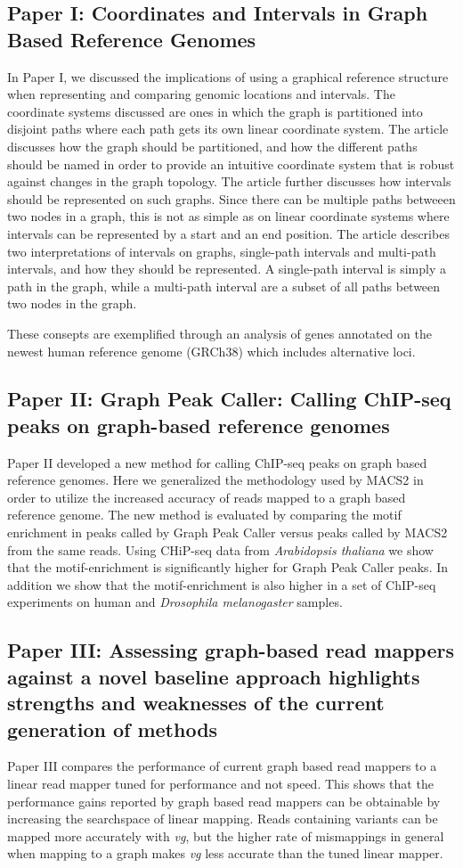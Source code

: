 \subsection*{Paper I: Coordinates and Intervals in Graph Based Reference Genomes}
In Paper I, we discussed the implications of using a graphical reference structure when representing and comparing genomic locations and intervals.
The coordinate systems discussed are ones in which the graph is partitioned into disjoint paths where each path gets its own linear coordinate system.
The article discusses how the graph should be partitioned, and how the different paths should be named in order to provide an intuitive coordinate system that is robust against changes in the graph topology. 
The article further discusses how intervals should be represented on such graphs.
Since there can be multiple paths betweeen two nodes in a graph, this is not as simple as on linear coordinate systems where intervals can be represented by a start and an end position.
The article describes two interpretations of intervals on graphs, single-path intervals and multi-path intervals, and how they should be represented.
A single-path interval is simply a path in the graph, while a multi-path interval are a subset of all paths between two nodes in the graph. 

These consepts are exemplified through an analysis of genes annotated on the newest human reference genome (GRCh38) which includes alternative loci.


\subsection*{Paper II: Graph Peak Caller: Calling ChIP-seq peaks on graph-based reference genomes}
Paper II developed a new method for calling ChIP-seq peaks on graph based reference genomes.
Here we generalized the methodology used by MACS2 in order to utilize the increased accuracy of reads mapped to a graph based reference genome.
The new method is evaluated by comparing the motif enrichment in peaks called by Graph Peak Caller versus peaks called by MACS2 from the same reads.
Using CHiP-seq data from \emph{Arabidopsis thaliana} we show that the motif-enrichment is significantly higher for Graph Peak Caller peaks.
In addition we show that the motif-enrichment is also higher in a set of ChIP-seq experiments on human and \emph{Drosophila melanogaster} samples.

\subsection*{Paper III: Assessing graph-based read mappers against a novel baseline approach highlights strengths and weaknesses of the current generation of methods}
Paper III compares the performance of current graph based read mappers to a linear read mapper tuned for performance and not speed.
This shows that the performance gains reported by graph based read mappers can be obtainable by increasing the searchspace of linear mapping.
Reads containing variants can be mapped more accurately with \emph{vg}, but the higher rate of mismappings in general when mapping to a graph makes \emph{vg} less accurate than the tuned linear mapper.

